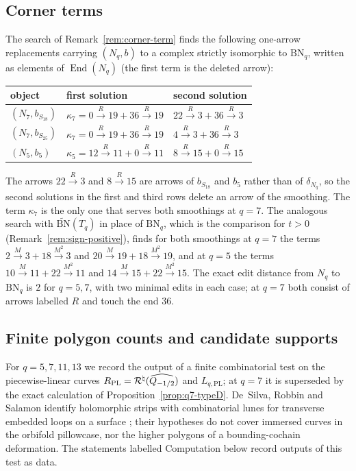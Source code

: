 \subsection{Corner terms}\label{ss:corner-terms}
The search of Remark~\ref{rem:corner-term} finds the following one-arrow replacements carrying
$(N_q,b)$ to a complex strictly isomorphic to $\mathrm{BN}_q$, written as elements of
$\operatorname{End}(N_q)$ (the first term is the deleted arrow):
\begin{center}
\begin{tabular}{lll}
\toprule
object & first solution & second solution\\
\midrule
$(N_7,b_{S_{18}})$ & $\kappa_7=0\xrightarrow R19+36\xrightarrow R19$ & $22\xrightarrow R3+36\xrightarrow R3$\\
$(N_7,b_{S_{25}})$ & $\kappa_7=0\xrightarrow R19+36\xrightarrow R19$ & $4\xrightarrow R3+36\xrightarrow R3$\\
$(N_5,b_5)$ & $\kappa_5=12\xrightarrow R11+0\xrightarrow R11$ & $8\xrightarrow R15+0\xrightarrow R15$\\
\bottomrule
\end{tabular}
\end{center}
The arrows $22\xrightarrow R3$ and $8\xrightarrow R15$ are arrows of $b_{S_{18}}$ and $b_5$ rather
than of $\delta_{N_q}$, so the second solutions in the first and third rows delete an arrow of the
smoothing.  The term $\kappa_7$ is the only one that serves both smoothings at $q=7$.  The
analogous search with $\widetilde{\mathrm{BN}}(T_q)$ in place of $\mathrm{BN}_q$, which is the
comparison for $t>0$ (Remark~\ref{rem:sign-positive}), finds for both smoothings at $q=7$ the terms
$2\xrightarrow M3+18\xrightarrow{M^2}3$ and $20\xrightarrow M19+18\xrightarrow{M^2}19$, and at $q=5$
the terms $10\xrightarrow M11+22\xrightarrow{M^2}11$ and $14\xrightarrow M15+22\xrightarrow{M^2}15$.
The exact edit distance from $N_q$ to $\mathrm{BN}_q$ is $2$ for $q=5,7$, with two minimal edits in
each case; at $q=7$ both consist of arrows labelled $R$ and touch the end $36$.

\subsection{Finite polygon counts and candidate supports}\label{sec:compute}
For $q=5,7,11,13$ we record the output of a finite combinatorial test on the piecewise-linear
curves $R_{\mathrm{PL}}=\mathcal{R}^{\natural}(\widehat{Q_{-1/2}})$ and $L_{q,\mathrm{PL}}$; at $q=7$ it is superseded by the exact
calculation of Proposition~\ref{prop:q7-typeD}.  De~Silva, Robbin and Salamon
identify holomorphic strips with combinatorial lunes for transverse embedded loops on a surface
\cite{dSRS}; their hypotheses do not cover immersed curves in the orbifold pillowcase, nor the higher
polygons of a bounding-cochain deformation.  The statements labelled Computation below record outputs of
this test as data.

